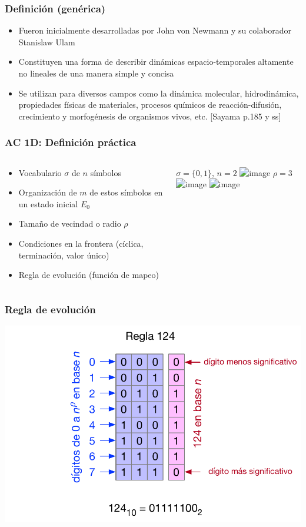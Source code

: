 \documentclass{beamer}
\begin{document}
\begin{frame}[t]
  \frametitle{Definición (genérica)}
  \begin{itemize}[<+->]
  \item Fueron inicialmente desarrolladas por John von Newmann y su colaborador Stanislaw Ulam 
  \item Constituyen una forma de describir dinámicas espacio-temporales altamente no lineales de una manera simple y concisa
  \item Se utilizan para diversos campos como la dinámica molecular, hidrodinámica, propiedades físicas de materiales, procesos químicos de reacción-difusión, crecimiento y morfogénesis de organismos vivos, etc. [Sayama p.185 y ss]
  \end{itemize}
\end{frame}

\begin{frame}[t]
  \frametitle{AC 1D: Definición práctica}
  \begin{columns}[t]
  \begin{block}{}
	\begin{itemize}[<+->]
		\item Vocabulario $\sigma$ de $n$ símbolos
		\item Organización de $m$ de estos símbolos en un estado inicial $E_{0}$
		\item Tamaño de vecindad o radio $\rho$
		\item Condiciones en la frontera (cíclica, terminación, valor único)
		\item Regla de evolución (función de mapeo)
	\end{itemize}
  \end{block}
  \begin{center}
	 {$\sigma = \{0, 1\}$, $n=2$}
	\includegraphics<2>[width=.9\textwidth]{automata1}
	\only<3> {$\rho=3$}
	\includegraphics<4>[width=.9\textwidth]{automata2}
	\includegraphics<5>[height=.4\textheight]{automata3}
  \end{center}
  \end{columns}
\end{frame}

\begin{frame}[t]
  \frametitle{Regla de evolución}
  \includegraphics[width=.9\textwidth]{automata4}
\end{frame}
\end{document}
